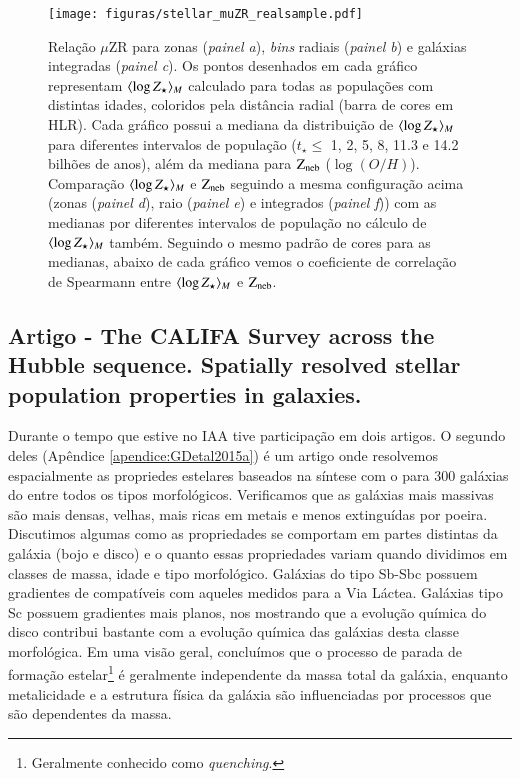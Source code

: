 \begin{figure}
	\centering
	\texttt{[image: figuras/stellar\_muZR\_realsample.pdf]}
	\caption[Relação $\mu$ZR e comparação entre as metalicidades]
	{Relação $\mu$ZR para zonas ({\em painel a}), {\em bins} radiais ({\em painel b}) e galáxias
integradas ({\em painel c}). Os pontos desenhados em cada gráfico representam $\meanM{\log Z_\star}$
calculado para todas as populações com distintas idades, coloridos pela distância radial (barra de
cores em HLR). Cada gráfico possui a mediana da distribuição de $\meanM{\log Z_\star}$ para
diferentes intervalos de população ($t_\star \leq$ 1, 2, 5, 8, 11.3 e 14.2 bilhões de anos), além
da mediana para $\mathrm{Z}_{\mathrm{neb}}$ ($\log(O/H)$). Comparação $\meanM{\log Z_\star}$ e
$\mathrm{Z}_{\mathrm{neb}}$ seguindo a mesma configuração acima (zonas ({\em painel d}), raio ({\em painel e}) e
integrados ({\em painel f})) com as medianas por diferentes intervalos de população no cálculo de
$\meanM{\log Z_\star}$ também. Seguindo o mesmo padrão de cores para as medianas, abaixo de cada
gráfico vemos o coeficiente de correlação de Spearmann entre $\meanM{\log Z_\star}$ e $\mathrm{Z}_{\mathrm{neb}}$.}
	\label{fig:ZstarvsZneb}
\end{figure}

\subsection{Artigo - The CALIFA Survey across the Hubble sequence. Spatially resolved stellar
population properties in galaxies.}

Durante o tempo que estive no IAA tive participação em dois artigos. O segundo deles
\citep{GonzalezDelgado.etal.2015a} (Apêndice \ref{apendice:GDetal2015a}) é um artigo onde
resolvemos espacialmente as propriedes estelares baseados na síntese com o \starlight para 300
galáxias do \CAL entre todos os tipos morfológicos. Verificamos que as galáxias mais massivas são
mais densas, velhas, mais ricas em metais e menos extinguídas por poeira. Discutimos algumas como as
propriedades se comportam em partes distintas da galáxia (bojo e disco) e o quanto essas
propriedades variam quando dividimos em classes de massa, idade e tipo morfológico. Galáxias do tipo
Sb-Sbc possuem gradientes de  compatíveis com aqueles medidos para a Via Láctea.
Galáxias tipo Sc possuem gradientes mais planos, nos mostrando que a evolução química do disco
contribui bastante com a evolução química das galáxias desta classe morfológica. Em uma visão geral,
concluímos que o processo de parada de formação estelar\footnote{Geralmente conhecido como {\em
quenching}.} é geralmente independente da massa total da galáxia, enquanto metalicidade e a
estrutura física da galáxia são influenciadas por processos que são dependentes da massa.

